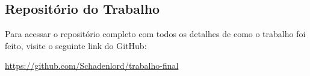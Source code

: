 
%
\begin{anexosenv}


\chapter{Repositório do Trabalho}

Para acessar o repositório completo com todos os detalhes de como o trabalho foi feito, visite o seguinte link do GitHub:

\url{https://github.com/Schadenlord/trabalho-final}


\end{anexosenv}
